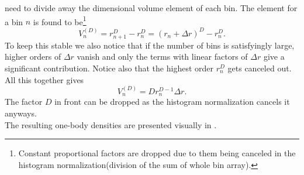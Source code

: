     need to divide away the dimensional volume element of each bin. The element
    for a bin $n$ is found to be\footnote{Constant proportional factors are
    dropped due to them being canceled in the histogram normalization(division
    of the sum of whole bin array).}
        \begin{equation}
            V^{(D)}_n = r^D_{n+1} - r^D_n = (r_n+\Delta r)^D - r^D_n.
        \end{equation}
    To keep this stable we also notice that if the number of bins is
    satisfyingly large, higher orders of $\Delta r$ vanish and only the terms
    with linear factors of $\Delta r$ give a significant contribution. Notice
    also that the highest order $r^D_n$ gets canceled out. All this together
    gives
        \begin{equation}
            V^{(D)}_n = Dr_n^{D-1}\Delta r.
        \end{equation}
    The factor $D$ in front can be dropped as the histogram normalization
    cancels it anyways. \\
    The resulting one-body densities are presented visually in . 
